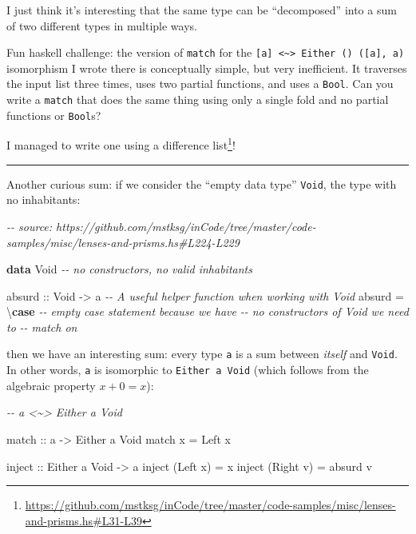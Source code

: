 \documentclass[]{article}
\newenvironment{Shaded}{}{}
\newcommand{\CommentTok}[1]{\textcolor[rgb]{0.38,0.63,0.69}{\textit{#1}}}
\newcommand{\DataTypeTok}[1]{\textcolor[rgb]{0.56,0.13,0.00}{#1}}
\newcommand{\KeywordTok}[1]{\textcolor[rgb]{0.00,0.44,0.13}{\textbf{#1}}}
\newcommand{\NormalTok}[1]{#1}
\newcommand{\OtherTok}[1]{\textcolor[rgb]{0.00,0.44,0.13}{#1}}
\renewcommand{\href}[2]{#2\footnote{\url{#1}}}
\begin{document}
I just think it's interesting that the same type can be ``decomposed'' into a
sum of two different types in multiple ways.

Fun haskell challenge: the version of \texttt{match} for the
\texttt{{[}a{]}\ \textless{}\textasciitilde{}\textgreater{}\ Either\ ()\ ({[}a{]},\ a)}
isomorphism I wrote there is conceptually simple, but very inefficient. It
traverses the input list three times, uses two partial functions, and uses a
\texttt{Bool}. Can you write a \texttt{match} that does the same thing using
only a single fold and no partial functions or \texttt{Bool}s?

I managed to write one
\href{https://github.com/mstksg/inCode/tree/master/code-samples/misc/lenses-and-prisms.hs\#L31-L39}{using
a difference list}!

\begin{center}\rule{0.5\linewidth}{0.5pt}\end{center}

Another curious sum: if we consider the ``empty data type'' \texttt{Void}, the
type with no inhabitants:

\begin{Shaded}
\begin{Highlighting}[]
\CommentTok{{-}{-} source: https://github.com/mstksg/inCode/tree/master/code{-}samples/misc/lenses{-}and{-}prisms.hs\#L224{-}L229}

\KeywordTok{data} \DataTypeTok{Void}           \CommentTok{{-}{-} no constructors, no valid inhabitants}

\OtherTok{absurd ::} \DataTypeTok{Void} \OtherTok{{-}\textgreater{}}\NormalTok{ a     }\CommentTok{{-}{-} A useful helper function when working with \textasciigrave{}Void\textasciigrave{}}
\NormalTok{absurd }\OtherTok{=}\NormalTok{ \textbackslash{}}\KeywordTok{case} \CommentTok{{-}{-} empty case statement because we have}
               \CommentTok{{-}{-} no constructors of \textquotesingle{}Void\textquotesingle{} we need to}
               \CommentTok{{-}{-} match on}
\end{Highlighting}
\end{Shaded}

then we have an interesting sum: every type \texttt{a} is a sum between
\emph{itself} and \texttt{Void}. In other words, \texttt{a} is isomorphic to
\texttt{Either\ a\ Void} (which follows from the algebraic property
\(x + 0 = x\)):

\begin{Shaded}
\begin{Highlighting}[]
\CommentTok{{-}{-} a \textless{}\textasciitilde{}\textgreater{} Either a Void}

\OtherTok{match ::}\NormalTok{ a }\OtherTok{{-}\textgreater{}} \DataTypeTok{Either}\NormalTok{ a }\DataTypeTok{Void}
\NormalTok{match x }\OtherTok{=} \DataTypeTok{Left}\NormalTok{ x}

\OtherTok{inject ::} \DataTypeTok{Either}\NormalTok{ a }\DataTypeTok{Void} \OtherTok{{-}\textgreater{}}\NormalTok{ a}
\NormalTok{inject (}\DataTypeTok{Left}\NormalTok{  x) }\OtherTok{=}\NormalTok{ x}
\NormalTok{inject (}\DataTypeTok{Right}\NormalTok{ v) }\OtherTok{=}\NormalTok{ absurd v}
\end{Highlighting}
\end{Shaded}
\end{document}
